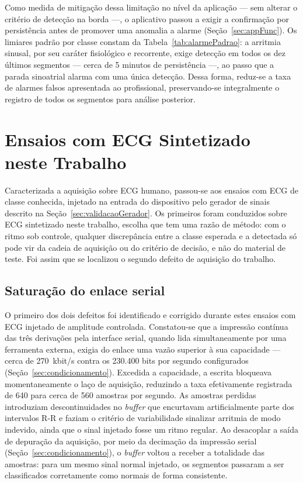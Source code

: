 Como medida de mitigação dessa limitação no nível da aplicação — sem alterar o critério de detecção na borda —, o aplicativo passou a exigir a confirmação por persistência antes de promover uma anomalia a alarme (Seção~\ref{sec:appFunc}). Os limiares padrão por classe constam da Tabela~\ref{tab:alarmePadrao}: a arritmia sinusal, por seu caráter fisiológico e recorrente, exige detecção em todos os dez últimos segmentos --- cerca de 5 minutos de persistência ---, ao passo que a parada sinoatrial alarma com uma única detecção. Dessa forma, reduz-se a taxa de alarmes falsos apresentada ao profissional, preservando-se integralmente o registro de todos os segmentos para análise posterior.

\section{Ensaios com ECG Sintetizado neste Trabalho}
\label{sec:resEcgSintetico}

Caracterizada a aquisição sobre \acs{ECG} humano, passou-se aos ensaios com \acs{ECG} de
classe conhecida, injetado na entrada do dispositivo pelo gerador de sinais descrito na
Seção~\ref{sec:validacaoGerador}. Os primeiros foram conduzidos sobre \acs{ECG} sintetizado
neste trabalho, escolha que tem uma razão de método: com o ritmo sob controle, qualquer
discrepância entre a classe esperada e a detectada só pode vir da cadeia de aquisição ou do
critério de decisão, e não do material de teste. Foi assim que se localizou o segundo
defeito de aquisição do trabalho.

\subsection{Saturação do enlace serial}
\label{sec:resSerial}

O primeiro dos dois defeitos foi identificado e corrigido durante estes ensaios com \acs{ECG} injetado de amplitude controlada. Constatou-se que a impressão contínua das três derivações pela interface serial, quando lida simultaneamente por uma ferramenta externa, exigia do enlace uma vazão superior à sua capacidade — cerca de 270~kbit/s contra os 230.400 bits por segundo configurados (Seção~\ref{sec:condicionamento}). Excedida a capacidade, a escrita bloqueava momentaneamente o laço de aquisição, reduzindo a taxa efetivamente registrada de 640 para cerca de 560 amostras por segundo. As amostras perdidas introduziam descontinuidades no \textit{buffer} que encurtavam artificialmente parte dos intervalos R-R e faziam o critério de variabilidade sinalizar arritmia de modo indevido, ainda que o sinal injetado fosse um ritmo regular. Ao desacoplar a saída de depuração da aquisição, por meio da decimação da impressão serial (Seção~\ref{sec:condicionamento}), o \textit{buffer} voltou a receber a totalidade das amostras: para um mesmo sinal normal injetado, os segmentos passaram a ser classificados corretamente como normais de forma consistente.

